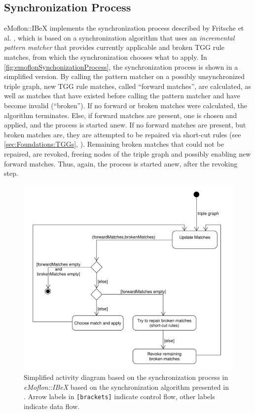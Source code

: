 \subsection{Synchronization Process}
\label{sec:Foundations:eMoflon:syncProcess}
eMoflon::IBeX implements the synchronization process described by Fritsche et al. \cite{fritsche_short-cut-rules-repair-tgg_2021}, which is based on a synchronization algorithm that uses an \emph{incremental pattern matcher} that provides currently applicable and broken TGG rule matches, from which the synchronization chooses what to apply. 
In \autoref{fig:emoflonSynchonizationProcess}, the synchronization process is shown in a simplified version.
By calling the pattern matcher on a possibly unsynchronized triple graph, new TGG rule matches, called \enquote{forward matches}, are calculated, as well as matches that have existed before calling the pattern matcher and have become invalid (\enquote{broken}).
If no forward or broken matches were calculated, the algorithm terminates.
Else, if forward matches are present, one is chosen and applied, and the process is started anew.
If no forward matches are present, but broken matches are, they are attempted to be repaired via short-cut rules (see \autoref{sec:Foundations:TGGs}, \cite{fritsche_short-cut-theoretical_2018, fritsche_short-cut-rules-repair-tgg_2021, fritsche_higher_order_short_cut_rules_2023}).
Remaining broken matches that could not be repaired, are revoked, freeing nodes of the triple graph and possibly enabling new forward matches. Thus, again, the process is started anew, after the revoking step.

\begin{figure}
\centering
\includegraphics[width=15cm]{figures/emoflonSynchonizationProcess.pdf}
\caption[Activity diagram of the synchronization process in \emph{eMoflon::IBeX}]{Simplified activity diagram based on the synchronization process in \emph{eMoflon::IBeX} based on the synchronization algorithm presented in \cite{fritsche_short-cut-rules-repair-tgg_2021}. Arrow labels in \texttt{[brackets]} indicate control flow, other labels indicate data flow.}
\label{fig:emoflonSynchonizationProcess}
\end{figure}

